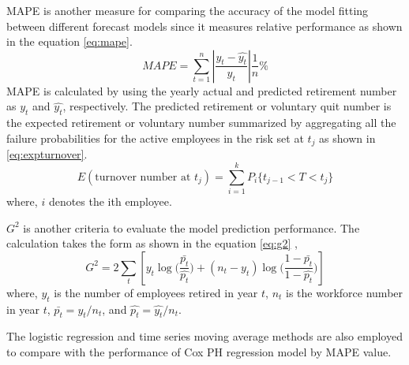 \documentclass[12pt,letterpaper]{article}
\begin{document}
MAPE is another measure for comparing the accuracy of the model fitting between different forecast models since it measures relative performance \citep{chu1998} as shown in the equation \ref{eq:mape}.
\begin{equation}
	\label{eq:mape}
	MAPE=\sum_{t=1}^{n}\left | \frac{y_t-\hat{y_t}}{y_t} \right |\frac{1}{n}\%
\end{equation}
MAPE is calculated by using the yearly actual and predicted retirement number as $y_t$ and $\hat{y_t}$, respectively.
The predicted retirement or voluntary quit number is the expected retirement or voluntary number summarized by aggregating all the failure probabilities for the active employees in the risk set at $t_j$ as shown in \ref{eq:expturnover}.
\begin{equation}
\label{eq:expturnover}
E(\text{turnover number at } t_j)=\sum_{i=1}^k{P_i\{t_{j-1}<T<t_j\}}
\end{equation}
where, $i$ denotes the ith employee.

$G^2$ is another criteria to evaluate the model prediction performance. The calculation takes the form as shown in the equation \ref{eq:g2} \citep{simonoff2013},
\begin{equation}
\label{eq:g2}
G^2=2\sum_{t}[y_t\log{(\frac{\bar{p_t}}{\hat{p_t}}})+ (n_t-y_t)\log{(\frac{1-\bar{p_t}}{1-\hat{p_t}}})]
\end{equation}
where, $y_t$ is the number of employees retired in year $t$, $n_t$ is the workforce number in year $t$, $\bar{p_t}={y_t}/{n_t}$, and $\hat{p_t}={\hat{y_t}}/{n_t} $.


The logistic regression and time series moving average methods are also employed to compare with the  performance of Cox PH regression model by MAPE value.


\end{document}
